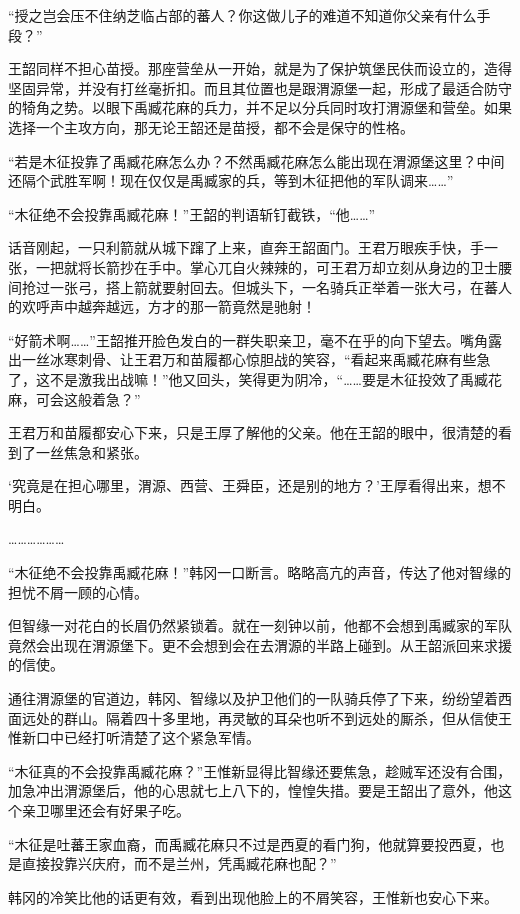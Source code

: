“授之岂会压不住纳芝临占部的蕃人？你这做儿子的难道不知道你父亲有什么手段？”

王韶同样不担心苗授。那座营垒从一开始，就是为了保护筑堡民伕而设立的，造得坚固异常，并没有打丝毫折扣。而且其位置也是跟渭源堡一起，形成了最适合防守的犄角之势。以眼下禹臧花麻的兵力，并不足以分兵同时攻打渭源堡和营垒。如果选择一个主攻方向，那无论王韶还是苗授，都不会是保守的性格。

“若是木征投靠了禹臧花麻怎么办？不然禹臧花麻怎么能出现在渭源堡这里？中间还隔个武胜军啊！现在仅仅是禹臧家的兵，等到木征把他的军队调来……”

“木征绝不会投靠禹臧花麻！”王韶的判语斩钉截铁，“他……”

话音刚起，一只利箭就从城下蹿了上来，直奔王韶面门。王君万眼疾手快，手一张，一把就将长箭抄在手中。掌心兀自火辣辣的，可王君万却立刻从身边的卫士腰间抢过一张弓，搭上箭就要射回去。但城头下，一名骑兵正举着一张大弓，在蕃人的欢呼声中越奔越远，方才的那一箭竟然是驰射！

“好箭术啊……”王韶推开脸色发白的一群失职亲卫，毫不在乎的向下望去。嘴角露出一丝冰寒刺骨、让王君万和苗履都心惊胆战的笑容，“看起来禹臧花麻有些急了，这不是激我出战嘛！”他又回头，笑得更为阴冷，“……要是木征投效了禹臧花麻，可会这般着急？”

王君万和苗履都安心下来，只是王厚了解他的父亲。他在王韶的眼中，很清楚的看到了一丝焦急和紧张。

‘究竟是在担心哪里，渭源、西营、王舜臣，还是别的地方？’王厚看得出来，想不明白。

………………

“木征绝不会投靠禹臧花麻！”韩冈一口断言。略略高亢的声音，传达了他对智缘的担忧不屑一顾的心情。

但智缘一对花白的长眉仍然紧锁着。就在一刻钟以前，他都不会想到禹臧家的军队竟然会出现在渭源堡下。更不会想到会在去渭源的半路上碰到。从王韶派回来求援的信使。

通往渭源堡的官道边，韩冈、智缘以及护卫他们的一队骑兵停了下来，纷纷望着西面远处的群山。隔着四十多里地，再灵敏的耳朵也听不到远处的厮杀，但从信使王惟新口中已经打听清楚了这个紧急军情。

“木征真的不会投靠禹臧花麻？”王惟新显得比智缘还要焦急，趁贼军还没有合围，加急冲出渭源堡后，他的心思就七上八下的，惶惶失措。要是王韶出了意外，他这个亲卫哪里还会有好果子吃。

“木征是吐蕃王家血裔，而禹臧花麻只不过是西夏的看门狗，他就算要投西夏，也是直接投靠兴庆府，而不是兰州，凭禹臧花麻也配？”

韩冈的冷笑比他的话更有效，看到出现他脸上的不屑笑容，王惟新也安心下来。

